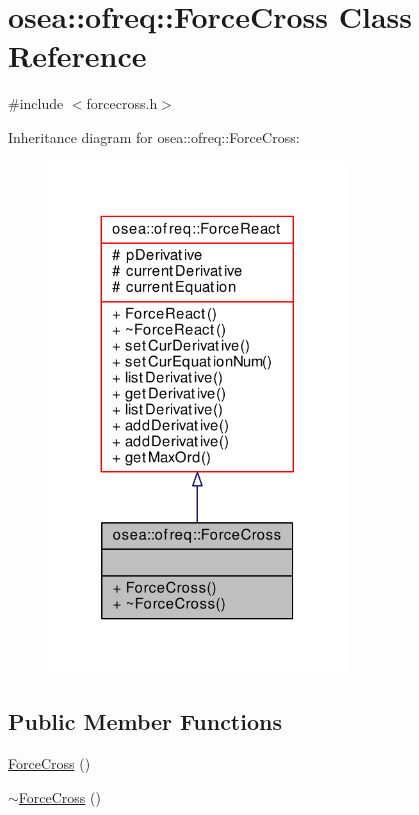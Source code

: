 \hypertarget{classosea_1_1ofreq_1_1_force_cross}{\section{osea\-:\-:ofreq\-:\-:Force\-Cross Class Reference}
\label{classosea_1_1ofreq_1_1_force_cross}
}


{\ttfamily \#include $<$forcecross.\-h$>$}



Inheritance diagram for osea\-:\-:ofreq\-:\-:Force\-Cross\-:
\nopagebreak
\begin{figure}[H]
\begin{center}
\leavevmode
\includegraphics[width=224pt]{classosea_1_1ofreq_1_1_force_cross__inherit__graph}
\end{center}
\end{figure}
\subsection*{Public Member Functions}
\begin{DoxyCompactItemize}
\item 
\hyperlink{classosea_1_1ofreq_1_1_force_cross_a0dd29488051709ddbb950ee75565c53a}{Force\-Cross} ()
\item 
\hyperlink{classosea_1_1ofreq_1_1_force_cross_ad5fc44b9a9d71823f80467f560cfdecc}{$\sim$\-Force\-Cross} ()
\end{DoxyCompactItemize}
